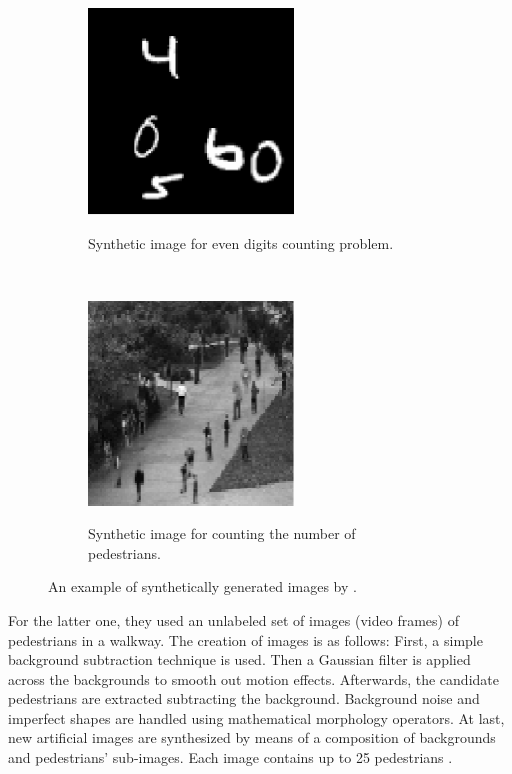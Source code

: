 \begin{figure}[h!]
    \centering
    \begin{subfigure}[t]{0.5\textwidth}
        \centering
        {\includegraphics[width=0.6\textwidth]{images/digdigdig}}
        \caption{Synthetic image for even digits counting problem.}
    \end{subfigure}%
    ~ 
    \begin{subfigure}[t]{0.5\textwidth}
        \centering
        {\includegraphics[width=0.6\textwidth]{images/pedpedped}}
        \caption{Synthetic image for counting the number of pedestrians.}
    \end{subfigure}
    \caption{An example of synthetically generated images by \citealt*{segui2015learning}.}
    \label{backback}
\end{figure}

For the latter one, they used an unlabeled set of images (video frames) of pedestrians in a walkway. The creation of images is as follows: First, a simple background subtraction technique is used. Then a Gaussian filter is applied across the backgrounds to smooth out motion effects. Afterwards, the candidate pedestrians are extracted subtracting the background. Background noise and imperfect shapes are handled using mathematical morphology operators. At last, new artificial images are synthesized by means of a composition of backgrounds and pedestrians' sub-images. Each image contains up to 25 pedestrians \cite{segui2015learning}.     
  
